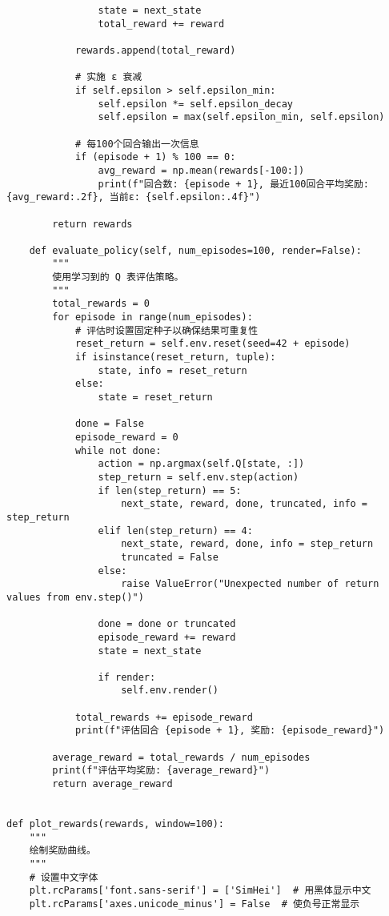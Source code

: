 \begin{lstlisting}
                state = next_state
                total_reward += reward

            rewards.append(total_reward)

            # 实施 ε 衰减
            if self.epsilon > self.epsilon_min:
                self.epsilon *= self.epsilon_decay
                self.epsilon = max(self.epsilon_min, self.epsilon)

            # 每100个回合输出一次信息
            if (episode + 1) % 100 == 0:
                avg_reward = np.mean(rewards[-100:])
                print(f"回合数: {episode + 1}, 最近100回合平均奖励: {avg_reward:.2f}, 当前ε: {self.epsilon:.4f}")

        return rewards

    def evaluate_policy(self, num_episodes=100, render=False):
        """
        使用学习到的 Q 表评估策略。
        """
        total_rewards = 0
        for episode in range(num_episodes):
            # 评估时设置固定种子以确保结果可重复性
            reset_return = self.env.reset(seed=42 + episode)
            if isinstance(reset_return, tuple):
                state, info = reset_return
            else:
                state = reset_return

            done = False
            episode_reward = 0
            while not done:
                action = np.argmax(self.Q[state, :])
                step_return = self.env.step(action)
                if len(step_return) == 5:
                    next_state, reward, done, truncated, info = step_return
                elif len(step_return) == 4:
                    next_state, reward, done, info = step_return
                    truncated = False
                else:
                    raise ValueError("Unexpected number of return values from env.step()")

                done = done or truncated
                episode_reward += reward
                state = next_state

                if render:
                    self.env.render()

            total_rewards += episode_reward
            print(f"评估回合 {episode + 1}, 奖励: {episode_reward}")

        average_reward = total_rewards / num_episodes
        print(f"评估平均奖励: {average_reward}")
        return average_reward


def plot_rewards(rewards, window=100):
    """
    绘制奖励曲线。
    """
    # 设置中文字体
    plt.rcParams['font.sans-serif'] = ['SimHei']  # 用黑体显示中文
    plt.rcParams['axes.unicode_minus'] = False  # 使负号正常显示


\end{lstlisting}

